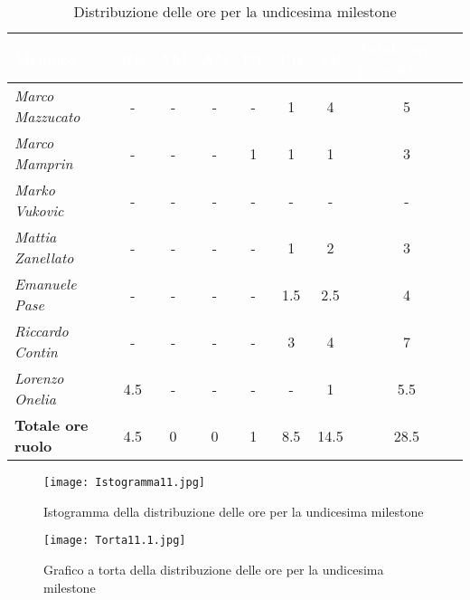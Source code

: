 \begin{table}[H]
    \renewcommand\arraystretch{1.5}
    \centering
    \begin{tabular}{|l|c|c|c|c|c|c|c|}
    \hline
    \rowcolor[HTML]{036400}
    \textcolor{white}{\textbf{Membro}} & \multicolumn{1}{l|}{\textcolor{white}{\textbf{RE}}} & \multicolumn{1}{l|}{\textcolor{white}{\textbf{AM}}} & \multicolumn{1}{l|}{\textcolor{white}{\textbf{AN}}} & \multicolumn{1}{l|}{\textcolor{white}{\textbf{PT}}} & \multicolumn{1}{l|}{\textcolor{white}{\textbf{PR}}} & \multicolumn{1}{l|}{\textcolor{white}{\textbf{VE}}} & \multicolumn{1}{l|}{\textcolor{white}{\textbf{Totale ore persona}}} \\ \hline
    \rowcolor[HTML]{EFEFEF}\textit{Marco Mazzucato}  & -   & -   & -  & -    & 1    & 4      & 5     \\ \hline
    \rowcolor[HTML]{C0C0C0}\textit{Marco Mamprin}    & -   & -   & -  & 1    & 1    & 1      & 3     \\ \hline
    \rowcolor[HTML]{EFEFEF}\textit{Marko Vukovic}    & -   & -   & -  & -    & -    & -      & -     \\ \hline
    \rowcolor[HTML]{C0C0C0}\textit{Mattia Zanellato} & -   & -   & -  & -    & 1    & 2      & 3     \\ \hline
    \rowcolor[HTML]{EFEFEF}\textit{Emanuele Pase}    & -   & -   & -  & -    & 1.5  & 2.5    & 4     \\ \hline
    \rowcolor[HTML]{C0C0C0}\textit{Riccardo Contin}  & -   & -   & -  & -    & 3    & 4      & 7     \\ \hline
    \rowcolor[HTML]{EFEFEF}\textit{Lorenzo Onelia}   & 4.5 & -   & -  & -    & -    & 1      & 5.5    \\ \hline
    \rowcolor[HTML]{C0C0C0}\textbf{Totale ore ruolo} & 4.5 & 0   & 0  & 1    & 8.5  & 14.5   & 28.5    \\ \hline
    \end{tabular}
    \caption{Distribuzione delle ore per la undicesima milestone}
\end{table}

\begin{figure}[H]
    \texttt{[image: Istogramma11.jpg]}
    \caption{Istogramma della distribuzione delle ore per la undicesima milestone}
\end{figure}

\begin{figure}[H]
    \texttt{[image: Torta11.1.jpg]}
    \caption{Grafico a torta della distribuzione delle ore per la undicesima milestone}
\end{figure}

